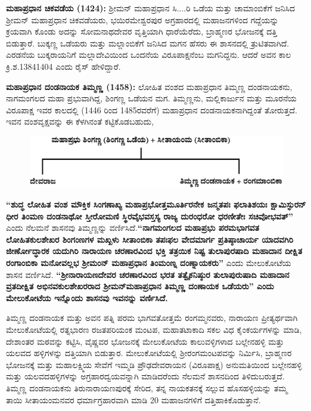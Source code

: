 \textbf{ಮಹಾಪ್ರಧಾನ ಚಿಕವಡೆಯ (1424):} ಶ‍್ರೀಮನ್​ ಮಹಾಪ್ರಧಾನ ಸಿ....ರಿ ಒಡೆಯ ಮತ್ತು ಚಾಮಾಂಬಿಕೆಗೆ ಜನಿಸಿದ ಶ‍್ರೀಮನ್​ ಮಹಾಪ್ರಧಾನ ಚಿಕವಡೆಯರು, ಭಯಿರಮೇಶ್ವರಪುರ ಅಗ್ರಹಾರದಲ್ಲಿ ಮಹಾಜನಗಳಿಂದ ಗದ್ದೆಯನ್ನು ಕ್ರಯವಾಗಿ ಕೊಂಡು ಅದನ್ನು ಸೋಮನಾಥದೇವರ ವೃತ್ತಿಯಾಗಿ ಧಾರೆಯೆರೆದು, ಬ್ರಾಹ್ಮಣರ ಭೋಜನಕ್ಕೆ ದತ್ತಿ ಬಿಡುತ್ತಾರೆ. ಬುಕ್ಕಣ್ಣ ಒಡೆಯರು ಮತ್ತು ಮಲ್ಲಾಂಬಿಕೆಗೆ ಜನಿಸಿದ ಮಗನ ಹೆಸರು ಈ ಶಾಸನದಲ್ಲಿ ತ್ರುಟಿತವಾಗಿದೆ. ಎರಡನೆಯ ಬುಕ್ಕರಾಯನಿಗೆ ಮಲ್ಲಾದೇವಿಯಿಂದ ಒಂದನೆಯ ವಿರೂಪಾಕ್ಷನೆಂಬ ಮಗನಿದ್ದನು. ಆದರೆ ಅವನ ಕಾಲ ಕ್ರಿ.ಶ.1384\enginline{-}1404 ಎಂದು ರೈಸ್​ ಹೇಳಿದ್ದಾರೆ.

\textbf{ಮಹಾಪ್ರಧಾನ ದಂಡನಾಯಕ ತಿಮ್ಮಣ್ಣ (1458):} ಲೋಹಿತ ವಂಶದ ಮಹಾಪ್ರಧಾನ ತಿಮ್ಮಣ್ಣ ದಂಡನಾಯಕನು, ನಾಗಮಂಗಲದ ಮಹಾ ಪ್ರಭುವಾಗಿದ್ದ, ಶಿಂಗಣ್ಣ ಒಡೆಯನ ಮಗ. ತಿಮ್ಮಣ್ಣನು, ಮಲ್ಲಿಕಾರ್ಜುನ ಮತ್ತು ಮೂರನೆಯ ವಿರೂಪಾಕ್ಷ ಇವರ ಕಾಲದಲ್ಲಿ (1446 ರಿಂದ 1485ರವರೆಗೆ) ಮಹಾಪ್ರಧಾನ ದಂಡನಾಯಕನಾಗಿದ್ದಂತೆ ತೋರುತ್ತದೆ. ಇವನ ವಂಶವೃಕ್ಷವನ್ನು ಈ ಕೆಳಗಿನಂತೆ ಕಟ್ಟಿಕೊಡಬಹುದು,

\begin{figure}[H]
\includegraphics[scale=1.2]{images/chap3/chap3fig38.jpeg}
\end{figure}

\vskip 2pt

\textbf{“ಶುದ್ಧ ಲೋಹಿತ ವಂಶ ಮೌಕ್ತಿಕ ಸಿಂಗಣಾಖ್ಯ ಮಹಾಪ್ರಭೋತ್ತಮೂರ್ತಿರನೇಕ ಜನ್ಮತಪಃ ಫಲಾತಿಶಯಃ ಕ್ಷಾಮಿಸ್ಫುರನ್​ ಧೀರ ತಿಂಮಣ ದಂಡನಾಥೋ ಸ್ತೀರೋಮಣಿ ಸ್ಥಿರವೈಭವಸ್ತಸ್ಯ ರಾಜ್ಯ ದುರಂಧರೋ ಧರಣೀತೇಃ ಸಚಿವೋಭವತ್​”} ಎಂದು ನೆಲಮನೆ ಶಾಸನವು ತಿಮ್ಮಣ್ಣನ್ನು ವರ್ಣಿಸಿದೆ.\textbf{“ನಾಗಮಂಗಲದ ಮಹಾಪ್ರಭು ಪರಮಭಾಗವತ ಲೋಹಿತಕುಲಶೇಖರ ಶಿಂಗಂಣಗಳ ಮಖ್ಖಳು ಸೀತಾಂಬಿಕಾ ತಪಃಫಲ ವೇದಮಾರ್ಗ ಪ್ರತಿಷ್ಠಾಚಾರ್ಯ ಯಾದವಗಿರಿ ಜೀರ್ಣೋದ್ಧಾರಕ ಯದುಗಿರಿ ನಾರಾಯಣ ಚರಣಾರವಿಂದ ಭಕ್ತಿ ತತ್ರಯಿಕ ನಿಷ್ಟ ತುಲಾಪುರಷಾದಿ ಮಹಾದಾನ ದೀಕ್ಷಿತ ರಂಗಾಂಬಿಕಾ ಮನೋವಲ್ಲಭ ಶ‍್ರೀಮಂನ್​ ಮಹಾಪ್ರಧಾನ ತಿಂಮಂಣ್ನ ದಂಣ್ನಾಯಕರು”} ಎಂದು ಮೇಲುಕೋಟೆಯ ಶಾಸನ ವರ್ಣಿಸಿದೆ.\textbf{ “ಶ‍್ರೀನಾರಾಯಣ\-ದೇವರ ಚರಣಾರವಿಂದ ಭರತ ತತ್ವೈಕನಿಷ್ಠುರ ತುಲಾಪುರುಷಾದಿ ಮಹಾದಾನ ವ್ರತದೀಕ್ಷಿತ ಅಭಿನವಕುಲಶೇಖರರಾದ ಶ‍್ರೀಮನ್​ ಮಹಾಪ್ರಧಾನ ತಿಮ್ಮಣ್ಣ ದಂಣಾಯಕ ಒಡೆಯರು” ಎಂದು ಮೇಲುಕೋಟೆಯ ಇನ್ನೊಂದು ಶಾಸನವು ಇವನನ್ನು ವರ್ಣಿಸಿದೆ.}

ತಿಮ್ಮಣ್ಣ ದಂಡನಾಯಕ ಮತ್ತು ಅವನ ಪತ್ನಿ ಪರಮ ಭಾಗವತೋತ್ತಮೆ ರಂಗಮ್ಮನವರು, ನಾರಾಯಣ ಪ್ರೀತ್ಯರ್ಥವಾಗಿ ಮೇಲುಕೋಟೆಯಲ್ಲಿ ರತ್ನಭಾರಣ ರಜತಪರಿಯಂಕ ಮಂಟಪ, ಮಹಾತಟಾಕಾದಿ ಸಕಲ ವಿಧ ಕೈಂಕರ್ಯಗಳನ್ನು ಮಾಡಿ, ದೇಶಾಂತರ ಮಠವನ್ನು ಕಟ್ಟಿಸಿ, ವೈಷ್ಣವರ ಭೋಜನಕ್ಕೆ ಮೇಲುಕೋಟೆಯ ಕಾಲುವಳ್ಳಿಗಳಾದ ಬಲ್ಲೇನಹಳ್ಳಿ ಮತ್ತು ಯಲವದ ಹಳ್ಳಿಗಳನ್ನು ದತ್ತಿಯಾಗಿ ಬಿಡುತ್ತಾರ. ಮೇಲುಕೋಟೆಯಲ್ಲಿ ಶ‍್ರೀರಂಗಮಂಟಪವನ್ನು ನಿರ್ಮಿಸಿ, ಬ್ರಾಹ್ಮಣರ ಭೋಜನಕ್ಕೆ ಮತ್ತು ಮಹಾಲಕ್ಷ್ಮಿಯ ಸೇವೆಗೆ ಇಮ್ಮಡಿ ಪ್ರೌಢದೇವರಾಯನ (ವಿರೂಪಾಕ್ಷ) ಅನುಮತಿಯಿಂದ ಬಲ್ಲೇನಹಳ್ಳಿ ಮತ್ತು ಯಲವದಹಳ್ಳಿಗಳನ್ನು ಅಗ್ರಹಾರದ್ವಯವನ್ನಾಗಿ ಮಾಡಿದರೆಂದು ನೆಲಮನೆ ಶಾಸನದಿಂದ ತಿಳಿದುಬರುತ್ತದೆ. ತಿಮ್ಮಣ್ಣ ದಂಡನಾಯಕನು ತಿರುನಾರಾಯಣಪುರಕ್ಕೆ ಸೇರಿದ, ತನ್ನ ನಾಯಕತನಕ್ಕೆ ಸಲ್ಲುವ ಹೊಸಹಳ್ಳಿಯನ್ನು ತಮ್ಮ ತಾಯಿ ಸೀತಾಯಂಮ\-ನವರ ಧರ್ಮಾಗ್ರಹಾರವಾಗಿ ಮಾಡಿ 20 ಮಹಾಜನಗಳಿಗೆ ದತ್ತಿಹಾಕಿಕೊಡುತ್ತಾನೆ.

